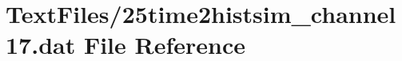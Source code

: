 \hypertarget{25time2histsim__channel17_8dat}{}\section{Text\+Files/25time2histsim\+\_\+channel17.dat File Reference}
\label{25time2histsim__channel17_8dat}
